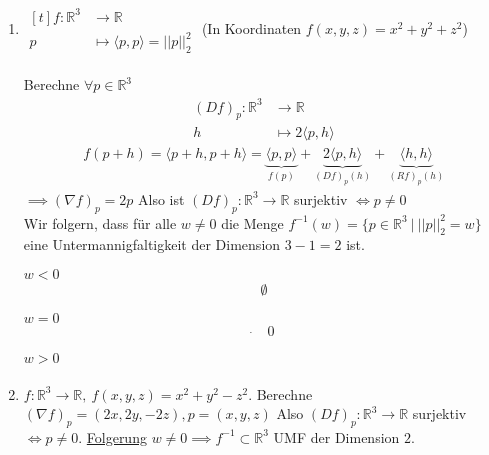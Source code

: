 \documentclass[../main.tex]{subfiles}
\begin{document}
\begin{examples}
\begin{enumerate}
    \item $\begin{aligned}[t]
        f \colon  \mathbb{R}^3 & \to \mathbb{R} \\
        p  & \mapsto \langle p, p \rangle = ||p||^2 _2
    \end{aligned}$
    \quad (In Koordinaten $f(x,y,z)=x^2 + y^2 + z^2$) \\ \\ Berechne $\forall p \in \mathbb{R}^3$
    \begin{align*}
        \left(Df\right)_p \colon \mathbb{R}^3 & \to \mathbb{R} \\
        h & \mapsto 2\langle p, h \rangle
    \end{align*}
    \begin{align*}
        f(p+h) = \langle p+h, p+h \rangle = \underbrace{\langle p,p \rangle}_\textrm{$f(p)$} +
        \underbrace{2\langle p,h \rangle}_\textrm{$(Df)_p(h)$} +
        \underbrace{\langle h,h \rangle}_\textrm{$(Rf)_p(h)$}
    \end{align*}
    $\implies (\nabla f)_p = 2p$ \quad Also ist $(Df)_p \colon \mathbb{R}^3 \to \mathbb{R}$ surjektiv $\iff p \not =0$\\
    Wir folgern, dass für alle $w \not = 0$ die Menge $f^{-1}(w) = \{p \in \mathbb{R}^3 \ \vert \ ||p||^2 _2 = w \}$ eine Untermannigfaltigkeit der Dimension $3-1 = 2$ ist.\\
    
    \begin{minipage}{2.5em} \underline{$w < 0$} \begin{align*} \emptyset \end{align*}
    \end{minipage}
    \qquad
    \begin{minipage}{5em} \underline{$w = 0$} \begin{align*} \Dot{} \quad 0 \end{align*}
    \end{minipage}
    \begin{minipage}{5em} \underline{$w > 0$} \begin{align*} \end{align*}
    \end{minipage}
    
    \item
    $f \colon \mathbb{R}^3 \to \mathbb{R}, \ f(x,y,z)=x^2+y^2-z^2$.
    Berechne $(\nabla f)_p = (2x, 2y, -2z), p = (x,y,z)$
    Also $(Df)_p \colon \mathbb{R}^3 \to \mathbb{R}$ surjektiv $\iff p \not = 0$.
    \underline{Folgerung} $w \not = 0 \implies f^{-1} \subset \mathbb{R}^3$ UMF der Dimension $2$.
\end{enumerate}
\end{examples}
\end{document}

